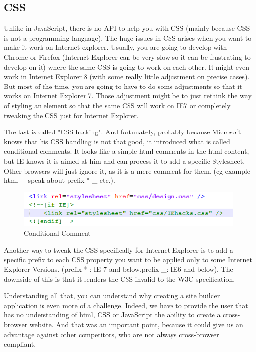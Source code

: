 \subsection{CSS}

Unlike in JavaScript, there is no API to help you with CSS (mainly because CSS is not a programming language). The huge issues in CSS arises when you want to make it work on Internet explorer. Usually, you are going to develop with Chrome or Firefox (Internet Explorer can be very slow so it can be frustrating to develop on it) where the same CSS is going to work on each other. It might even work in Internet Explorer 8 (with some really little adjustment on precise cases). But most of the time, you are going to have to do some adjustments so that it works on Internet Explorer 7. Those adjustment might be to just rethink the way of styling an element so that the same CSS will work on IE7 or completely tweaking the CSS just for Internet Explorer.

The last is called "CSS hacking". And fortunately, probably because Microsoft knows that his CSS handling is not that good, it introduced what is called conditional comments. It looks like a simple html comments in the html content, but IE knows it is aimed at him and can process it to add a specific Stylesheet. Other browsers will just ignore it, as it is a mere comment for them. (cg example html + speak about prefix * \_ etc.). 

\begin{figure}[!ht]
\centering
\includegraphics[width=.55\textwidth]{img/comments.png}
\caption{Conditional Comment}
\label{figure:conditional comment}
\end{figure}

Another way to tweak the CSS specifically for Internet Explorer is to add a specific prefix to each CSS property you want to be applied only to some Internet Explorer Versions. (prefix * : IE 7 and below,prefix \_: IE6 and below). The downside of this is that it renders the CSS invalid to the W3C specification.

Understanding all that, you can understand why creating a site builder application is even more of a challenge. Indeed, we have to provide the user that has no understanding of html, CSS or JavaScript the ability to create a cross-browser website. And that was an important point, because it could give us an advantage against other competitors, who are not always cross-browser compliant.
